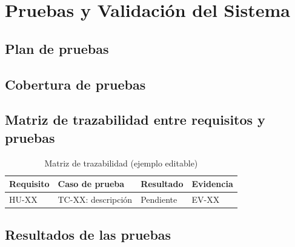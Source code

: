 \chapter{Pruebas y Validación del Sistema}
\label{cap:06_pruebas_validacion}

\section{Plan de pruebas}

\section{Cobertura de pruebas}

\section{Matriz de trazabilidad entre requisitos y pruebas}

\begin{table}[htbp]\centering
\caption{Matriz de trazabilidad (ejemplo editable)}\label{tab:trazabilidad}
\begin{tabularx}{\textwidth}{@{}lXll@{}}\toprule
Requisito & Caso de prueba & Resultado & Evidencia \\\midrule
HU-XX & TC-XX: descripción & Pendiente & EV-XX \\\bottomrule
\end{tabularx}\end{table}

\section{Resultados de las pruebas}

